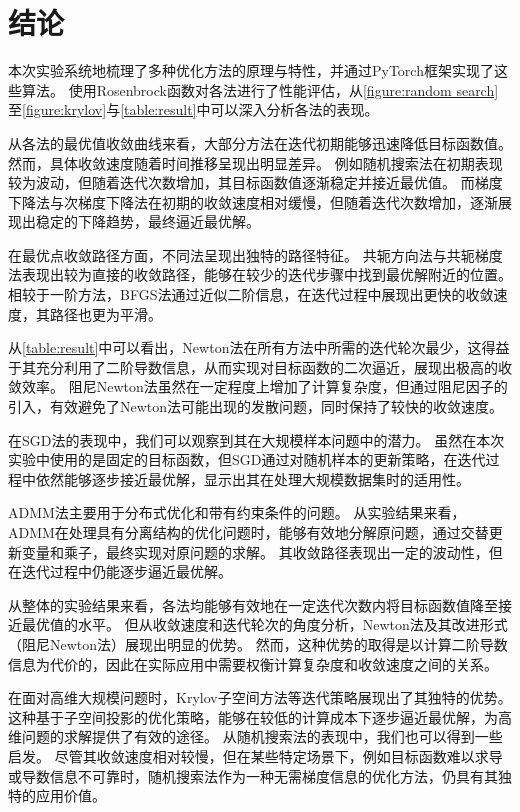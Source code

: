 \section{结论}

本次实验系统地梳理了多种优化方法的原理与特性，并通过PyTorch框架实现了这些算法。
使用Rosenbrock函数对各法进行了性能评估，从\cref{figure:random search}至\cref{figure:krylov}与\cref{table:result}中可以深入分析各法的表现。

从各法的最优值收敛曲线来看，大部分方法在迭代初期能够迅速降低目标函数值。
然而，具体收敛速度随着时间推移呈现出明显差异。
例如随机搜索法在初期表现较为波动，但随着迭代次数增加，其目标函数值逐渐稳定并接近最优值。
而梯度下降法与次梯度下降法在初期的收敛速度相对缓慢，但随着迭代次数增加，逐渐展现出稳定的下降趋势，最终逼近最优解。

在最优点收敛路径方面，不同法呈现出独特的路径特征。
共轭方向法与共轭梯度法表现出较为直接的收敛路径，能够在较少的迭代步骤中找到最优解附近的位置。
相较于一阶方法，BFGS法通过近似二阶信息，在迭代过程中展现出更快的收敛速度，其路径也更为平滑。

从\cref{table:result}中可以看出，Newton法在所有方法中所需的迭代轮次最少，这得益于其充分利用了二阶导数信息，从而实现对目标函数的二次逼近，展现出极高的收敛效率。
阻尼Newton法虽然在一定程度上增加了计算复杂度，但通过阻尼因子的引入，有效避免了Newton法可能出现的发散问题，同时保持了较快的收敛速度。

在SGD法的表现中，我们可以观察到其在大规模样本问题中的潜力。
虽然在本次实验中使用的是固定的目标函数，但SGD通过对随机样本的更新策略，在迭代过程中依然能够逐步接近最优解，显示出其在处理大规模数据集时的适用性。

ADMM法主要用于分布式优化和带有约束条件的问题。
从实验结果来看，ADMM在处理具有分离结构的优化问题时，能够有效地分解原问题，通过交替更新变量和乘子，最终实现对原问题的求解。
其收敛路径表现出一定的波动性，但在迭代过程中仍能逐步逼近最优解。

从整体的实验结果来看，各法均能够有效地在一定迭代次数内将目标函数值降至接近最优值的水平。
但从收敛速度和迭代轮次的角度分析，Newton法及其改进形式（阻尼Newton法）展现出明显的优势。
然而，这种优势的取得是以计算二阶导数信息为代价的，因此在实际应用中需要权衡计算复杂度和收敛速度之间的关系。

在面对高维大规模问题时，Krylov子空间方法等迭代策略展现出了其独特的优势。
这种基于子空间投影的优化策略，能够在较低的计算成本下逐步逼近最优解，为高维问题的求解提供了有效的途径。
从随机搜索法的表现中，我们也可以得到一些启发。
尽管其收敛速度相对较慢，但在某些特定场景下，例如目标函数难以求导或导数信息不可靠时，随机搜索法作为一种无需梯度信息的优化方法，仍具有其独特的应用价值。
